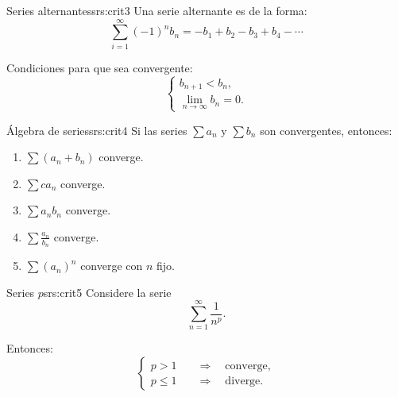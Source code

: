 \begin{teorema}{Series alternantes}{srs:crit3}
    Una serie alternante es de la forma:
    \[
        \sum_{i=1}^{\infty} (-1)^n b_n = -b_1 + b_2 - b_3 + b_4 - \cdots
    \]

    Condiciones para que sea convergente:
    \[
        \begin{cases}
            b_{n+1} < b_n, \\
            \lim_{n \to \infty} b_n = 0.
        \end{cases}
    \]
\end{teorema}

\begin{teorema}{Álgebra de series}{srs:crit4}
    Si las series $\sum a_n$ y $\sum b_n$ son convergentes, entonces:
    \begin{enumerate}
        \item $\sum (a_n + b_n)$ converge.
        \item $\sum c a_n$ converge.
        \item $\sum a_n b_n$ converge.
        \item $\sum \frac{a_n}{b_n}$ converge.
        \item $\sum (a_n)^n$ converge con $n$ fijo.
    \end{enumerate}
\end{teorema}

\begin{teorema}{Series $p$}{srs:crit5}
    Considere la serie
    \[
        \sum_{n=1}^{\infty} \frac{1}{n^p}.
    \]

    Entonces:
    \[
        \begin{cases}
            p > 1 \quad &\Rightarrow \quad \text{converge}, \\
            p \leq 1 \quad &\Rightarrow \quad \text{diverge}.
        \end{cases}
    \]
\end{teorema}


